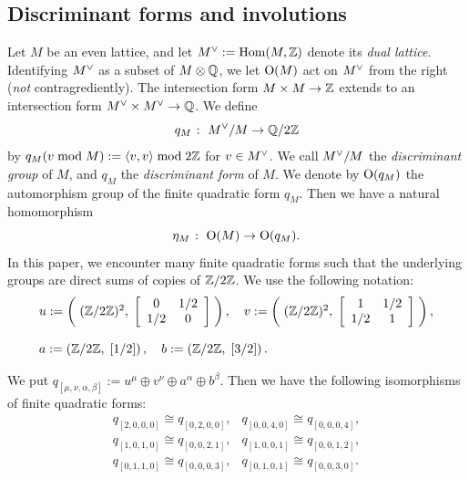 \documentclass{amsart} %
\begin{document}
\subsection{Discriminant forms and involutions}\label{subsec:discfinvol}
%
\newcommand{\dLat}{M}
\newcommand{\dLatplus}{M_+}
\newcommand{\dLatminus}{M_-}
%
Let $\dLat$ be an even lattice, and 
let $\dLat\dual:=\Hom(\dLat, \ZZ)$ 
 denote its \emph{dual lattice}.
Identifying $\dLat\dual$ as a subset of $\dLat\tensor \QQ$,
we let $\OG(\dLat)$ act on $\dLat\dual$ from the right
(\emph{not} contragrediently).
The intersection form $\dLat \times \dLat \to \ZZ$
extends to 
an intersection form $\dLat\dual \times \dLat\dual \to \QQ$.
We define 
\[
q_\dLat\;\colon\; \dLat\dual/\dLat \to \QQ/2\ZZ
\]
by $q_\dLat(v \bmod \dLat):=\intf{v, v} \bmod 2\ZZ$ for $v\in \dLat\dual$.
We call $\dLat\dual/\dLat$ the \emph{discriminant group} of $\dLat$,
and $q_\dLat$ the \emph{discriminant form} of $\dLat$.
We denote by $\OG(q_\dLat)$ the automorphism group of 
the finite quadratic form $q_\dLat$.
Then we have a natural homomorphism
\[
\eta_\dLat\;\colon\; \OG(\dLat) \to \OG(q_\dLat).
\]
%
In this paper,
we encounter many finite quadratic forms 
such that the underlying groups are 
direct sums of copies of $\mathord{\mathbb{Z}}/2\mathord{\mathbb{Z}}$. 
 We use the following notation:
%
\begin{equation}\label{eq:uvab}
\begin{array}{l}
u:=\left(\;(\mathord{\mathbb{Z}}/2\mathord{\mathbb{Z}})^2, \;\left[\begin{array}{cc}0&1/2 \\1/2 &0\end{array}\right]\;\right),\quad 
v:=\left(\;(\mathord{\mathbb{Z}}/2\mathord{\mathbb{Z}})^2, \;\left[\begin{array}{cc}1&1/2 \\1/2 &1\end{array}\right]\;\right),\\
\\
a:=\left(\mathord{\mathbb{Z}}/2\mathord{\mathbb{Z}}, \;\left[1/2\right]\right),\quad
b:=\left(\mathord{\mathbb{Z}}/2\mathord{\mathbb{Z}}, \;\left[3/2\right]\right).
\end{array}
\end{equation}
%
%
%
\begin{remark}\label{rem:isomqs}
We put $q_{[\mu,\nu, \alpha, \beta]}:=u^{\mu}\oplus v^{\nu} \oplus a^{\alpha}\oplus b^{\beta}$. 
Then we have the following isomorphisms of finite quadratic forms:
\[
\renewcommand{\arraystretch}{1.1}
\begin{array}{ll}
q_{[ 2, 0, 0, 0]}\cong q_{[ 0, 2, 0, 0]}, &
q_{[ 0, 0, 4, 0]}\cong q_{[ 0, 0, 0, 4]}, \\
q_{[ 1, 0, 1, 0]}\cong q_{[ 0, 0, 2, 1 ]}, &
q_{[ 1, 0, 0, 1]}\cong q_{[ 0, 0, 1, 2 ]},\\
q_{[ 0, 1, 1, 0 ]}\cong q_{[ 0, 0, 0, 3 ]}, &
q_{[ 0, 1, 0, 1 ]}\cong q_{[ 0, 0, 3, 0]}.
\end{array}
\]
\end{remark}
\end{document}
